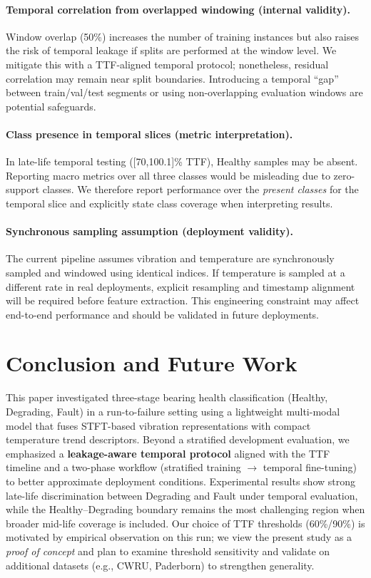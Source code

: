 \documentclass{article}
\begin{document}
\paragraph{Temporal correlation from overlapped windowing (internal validity).}
Window overlap (50\%) increases the number of training instances but also raises the risk of temporal leakage if splits are performed at the window level. We mitigate this with a TTF-aligned temporal protocol; nonetheless, residual correlation may remain near split boundaries. Introducing a temporal ``gap'' between train/val/test segments or using non-overlapping evaluation windows are potential safeguards.

\paragraph{Class presence in temporal slices (metric interpretation).}
In late-life temporal testing ([70,100.1]\% TTF), Healthy samples may be absent. Reporting macro metrics over all three classes would be misleading due to zero-support classes. We therefore report performance over the \emph{present classes} for the temporal slice and explicitly state class coverage when interpreting results.

\paragraph{Synchronous sampling assumption (deployment validity).}
The current pipeline assumes vibration and temperature are synchronously sampled and windowed using identical indices. If temperature is sampled at a different rate in real deployments, explicit resampling and timestamp alignment will be required before feature extraction. This engineering constraint may affect end-to-end performance and should be validated in future deployments.

\section{Conclusion and Future Work}
\label{sec:conclusion}

This paper investigated three-stage bearing health classification (Healthy, Degrading, Fault) in a run-to-failure setting using a lightweight multi-modal model that fuses STFT-based vibration representations with compact temperature trend descriptors. Beyond a stratified development evaluation, we emphasized a \textbf{leakage-aware temporal protocol} aligned with the TTF timeline and a two-phase workflow (stratified training $\rightarrow$ temporal fine-tuning) to better approximate deployment conditions. Experimental results show strong late-life discrimination between Degrading and Fault under temporal evaluation, while the Healthy--Degrading boundary remains the most challenging region when broader mid-life coverage is included. Our choice of TTF thresholds (60\%/90\%) is motivated by empirical observation on this run; we view the present study as a \emph{proof of concept} and plan to examine threshold sensitivity and validate on additional datasets (e.g., CWRU, Paderborn) to strengthen generality.
\end{document}
